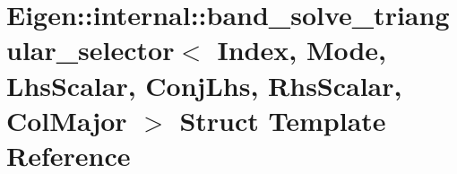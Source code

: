 \hypertarget{struct_eigen_1_1internal_1_1band__solve__triangular__selector_3_01_index_00_01_mode_00_01_lhs_sc55928e6c4094ec753b4bf039aa77c921}{}\section{Eigen\+:\+:internal\+:\+:band\+\_\+solve\+\_\+triangular\+\_\+selector$<$ Index, Mode, Lhs\+Scalar, Conj\+Lhs, Rhs\+Scalar, Col\+Major $>$ Struct Template Reference}
\label{struct_eigen_1_1internal_1_1band__solve__triangular__selector_3_01_index_00_01_mode_00_01_lhs_sc55928e6c4094ec753b4bf039aa77c921}
